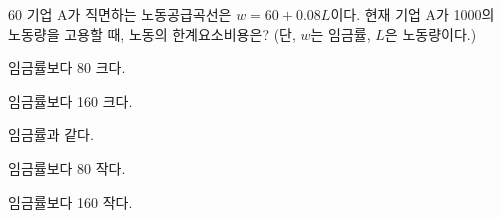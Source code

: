 \begin{question}{60}
기업 A가 직면하는 노동공급곡선은 $w=60+0.08L$이다. 현재 기업 A가 1000의 노동량을 고용할 때, 노동의 한계요소비용은? (단, $w$는 임금률, $L$은 노동량이다.)
\begin{choices}
  \item 임금률보다 80 크다.
  \item 임금률보다 160 크다.
  \item 임금률과 같다.
  \item 임금률보다 80 작다.
  \item 임금률보다 160 작다.
\end{choices}
\end{question}
